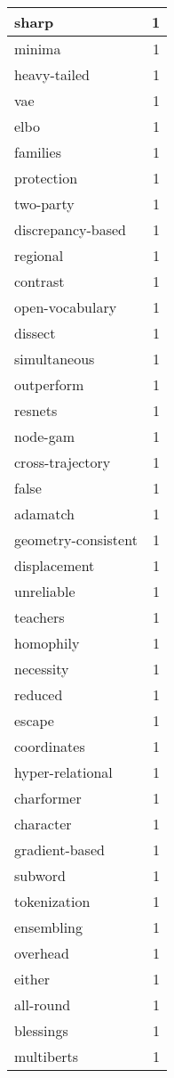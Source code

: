 \begin{table}[h]
\begin{tabular}{|l|r|}
\hline
sharp & 1 \\
\hline
minima & 1 \\
\hline
heavy-tailed & 1 \\
\hline
vae & 1 \\
\hline
elbo & 1 \\
\hline
families & 1 \\
\hline
protection & 1 \\
\hline
two-party & 1 \\
\hline
discrepancy-based & 1 \\
\hline
regional & 1 \\
\hline
contrast & 1 \\
\hline
open-vocabulary & 1 \\
\hline
dissect & 1 \\
\hline
simultaneous & 1 \\
\hline
outperform & 1 \\
\hline
resnets & 1 \\
\hline
node-gam & 1 \\
\hline
cross-trajectory & 1 \\
\hline
false & 1 \\
\hline
adamatch & 1 \\
\hline
geometry-consistent & 1 \\
\hline
displacement & 1 \\
\hline
unreliable & 1 \\
\hline
teachers & 1 \\
\hline
homophily & 1 \\
\hline
necessity & 1 \\
\hline
reduced & 1 \\
\hline
escape & 1 \\
\hline
coordinates & 1 \\
\hline
hyper-relational & 1 \\
\hline
charformer & 1 \\
\hline
character & 1 \\
\hline
gradient-based & 1 \\
\hline
subword & 1 \\
\hline
tokenization & 1 \\
\hline
ensembling & 1 \\
\hline
overhead & 1 \\
\hline
either & 1 \\
\hline
all-round & 1 \\
\hline
blessings & 1 \\
\hline
multiberts & 1 \\

\end{tabular}
\end{table}
